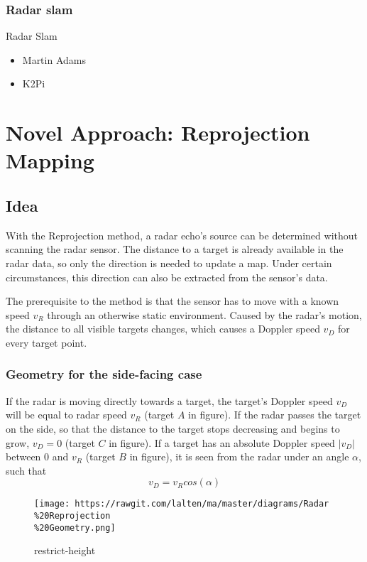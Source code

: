 \subsubsection{Radar slam}\label{radar-slam}

Radar Slam

\begin{itemize}
\tightlist
\item
  Martin Adams
\item
  K2Pi
\end{itemize}

\section{Novel Approach: Reprojection
Mapping}\label{novel-approach-reprojection-mapping}

\subsection{Idea}\label{idea}

With the Reprojection method, a radar echo's source can be determined
without scanning the radar sensor. The distance to a target is already
available in the radar data, so only the direction is needed to update a
map. Under certain circumstances, this direction can also be extracted
from the sensor's data.

The prerequisite to the method is that the sensor has to move with a
known speed \(v_R\) through an otherwise static environment. Caused by
the radar's motion, the distance to all visible targets changes, which
causes a Doppler speed \(v_D\) for every target point.

\subsubsection{Geometry for the side-facing
case}\label{geometry-for-the-side-facing-case}

If the radar is moving directly towards a target, the target's Doppler
speed \(v_D\) will be equal to radar speed \(v_R\) (target \(A\) in
figure). If the radar passes the target on the side, so that the
distance to the target stops decreasing and begins to grow, \(v_D = 0\)
(target \(C\) in figure). If a target has an absolute Doppler speed
\(|v_D|\) between \(0\) and \(v_R\) (target \(B\) in figure), it is seen
from the radar under an angle \(\alpha\), such that
\[v_D = v_R cos(\alpha)\]

\begin{figure}
\centering
\texttt{[image: https://rawgit.com/lalten/ma/master/diagrams/Radar\\\%20Reprojection\\\%20Geometry.png]}
\caption{restrict-height}
\end{figure}

